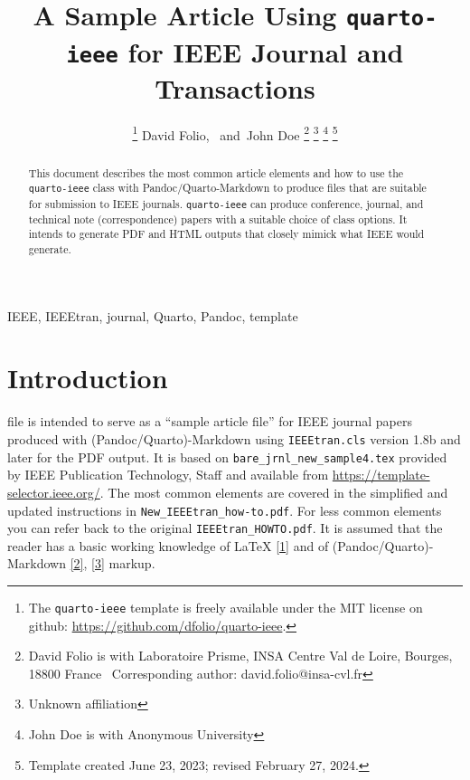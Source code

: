 \documentclass[
  journal,
]{IEEEtran}%
\title{A Sample Article Using \texttt{quarto-ieee} for IEEE Journal and
Transactions}
\author{
\thanks{The \texttt{quarto-ieee} template is freely available under the
MIT license on github: \url{https://github.com/dfolio/quarto-ieee}.}
David Folio\orcidlink{0000-0001-9430-6091},~\IEEEmembership{Member,
IEEE}
and~John Doe%
\thanks{David Folio is with Laboratoire Prisme, INSA Centre Val de
Loire, Bourges, 18800 France%
  Corresponding author: david.folio@insa-cvl.fr
}
\thanks{Unknown affiliation}
\thanks{John Doe is with Anonymous University%
}
\thanks{Template created June 23, 2023; revised February 27, 2024.}
}
\theoremstyle{plain}
\theoremstyle{remark}
\begin{document}


\maketitle

\begin{abstract}
This document describes the most common article elements and how to use
the \texttt{quarto-ieee} class with Pandoc/Quarto-Markdown to produce
files that are suitable for submission to IEEE journals.
\texttt{quarto-ieee} can produce conference, journal, and technical note
(correspondence) papers with a suitable choice of class options. It
intends to generate PDF and HTML outputs that closely mimick what IEEE
would generate.
\end{abstract}
\begin{IEEEkeywords}
IEEE, IEEEtran, journal, Quarto, Pandoc, template
\end{IEEEkeywords}

%

\ifdefined\Shaded\renewenvironment{Shaded}{\begin{tcolorbox}[frame hidden, enhanced, interior hidden, borderline west={3pt}{0pt}{shadecolor}, breakable, boxrule=0pt, sharp corners]}{\end{tcolorbox}}\fi

\hypertarget{sec-intro}{%
\section{Introduction}\label{sec-intro}}

 file is intended to serve as a ``sample article
file'' for IEEE journal papers produced with (Pandoc/Quarto)-Markdown
using \texttt{IEEEtran.cls} version 1.8b and later for the PDF output.
It is based on \texttt{bare\_jrnl\_new\_sample4.tex} provided by IEEE
Publication Technology, Staff and available from
\url{https://template-selector.ieee.org/}. The most common elements are
covered in the simplified and updated instructions in
\texttt{New\_IEEEtran\_how-to.pdf}. For less common elements you can
refer back to the original \texttt{IEEEtran\_HOWTO.pdf}. It is assumed
that the reader has a basic working knowledge of {\LaTeX}
\protect\hyperlink{ref-mittelbach2023latex}{{[}1{]}} and of
(Pandoc/Quarto)-Markdown
\protect\hyperlink{ref-MacFarlane_Pandoc}{{[}2{]}},
\protect\hyperlink{ref-Allaire_Quarto_2022}{{[}3{]}} markup.
\end{document}
